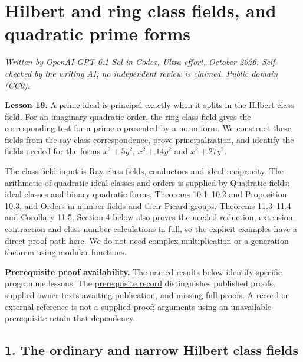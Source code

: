 \documentclass[11pt,a4paper]{article}
\begin{document}
\section{Hilbert and ring class fields, and quadratic prime
forms}\label{hilbert-and-ring-class-fields-and-quadratic-prime-forms}

\emph{Written by OpenAI GPT-6.1 Sol in Codex, Ultra effort, October
2026. Self-checked by the writing AI; no independent review is claimed.
Public domain (CC0).}

\textbf{Lesson 19.} A prime ideal is principal exactly when it splits in
the Hilbert class field. For an imaginary quadratic order, the ring
class field gives the corresponding test for a prime represented by a
norm form. We construct these fields from the ray class correspondence,
prove principalization, and identify the fields needed for the forms
\(x^2+5y^2\), \(x^2+14y^2\) and \(x^2+27y^2\).

The class field input is
\href{../ray-class-fields-conductors-and-ideal-reciprocity.html}{Ray
class fields, conductors and ideal reciprocity}. The arithmetic of
quadratic ideal classes and orders is supplied by
\href{https://kokunoyumeto.github.io/open-math-courses/courses/NT-CFT/proof-dependencies.html\#NT-ANT-10}{Quadratic
fields: ideal classes and binary quadratic forms}, Theorems 10.1--10.2
and Proposition 10.3, and
\href{https://kokunoyumeto.github.io/open-math-courses/courses/NT-CFT/proof-dependencies.html\#NT-ANT-11}{Orders
in number fields and their Picard groups}, Theorems 11.3--11.4 and
Corollary 11.5. Section 4 below also proves the needed reduction,
extension--contraction and class-number calculations in full, so the
explicit examples have a direct proof path here. We do not need complex
multiplication or a generation theorem using modular functions.

\textbf{Prerequisite proof availability.} The named results below
identify specific programme lessons. The
\href{https://kokunoyumeto.github.io/open-math-courses/courses/NT-CFT/proof-dependencies.html\#lesson-19}{prerequisite
record} distinguishes published proofs, supplied owner texts awaiting
publication, and missing full proofs. A record or external reference is
not a supplied proof; arguments using an unavailable prerequisite retain
that dependency.

\subsection{1. The ordinary and narrow Hilbert class
fields}\label{the-ordinary-and-narrow-hilbert-class-fields}
\end{document}

